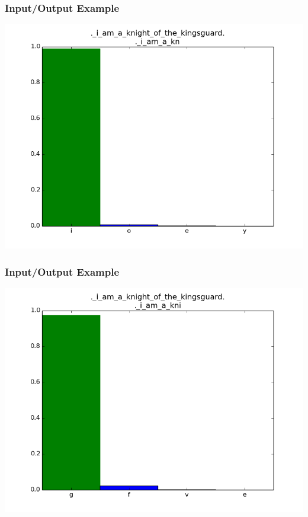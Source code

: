 \documentclass[12]{beamer}
\begin{document}
\begin{frame}
\frametitle{Input/Output Example}
\begin{center}
\includegraphics[scale=0.4]{../distplot/10.png}
\end{center}
\end{frame}

\begin{frame}
\frametitle{Input/Output Example}
\begin{center}
\includegraphics[scale=0.4]{../distplot/11.png}
\end{center}
\end{frame}
\end{document}
